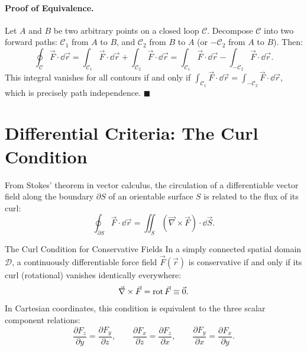 \paragraph{Proof of Equivalence.}
Let $A$ and $B$ be two arbitrary points on a closed loop $\mathcal{C}$. Decompose $\mathcal{C}$ into two forward paths: $\mathcal{C}_1$ from $A$ to $B$, and $\mathcal{C}_2$ from $B$ to $A$ (or $-\mathcal{C}_2$ from $A$ to $B$). Then:
\[
\oint_{\mathcal{C}} \vec{F}\cdot\dd\vec{r} = \int_{\mathcal{C}_1} \vec{F}\cdot\dd\vec{r} + \int_{\mathcal{C}_2} \vec{F}\cdot\dd\vec{r} = \int_{\mathcal{C}_1} \vec{F}\cdot\dd\vec{r} - \int_{-\mathcal{C}_2} \vec{F}\cdot\dd\vec{r}.
\]
This integral vanishes for all contours if and only if $\int_{\mathcal{C}_1} \vec{F}\cdot\dd\vec{r} = \int_{-\mathcal{C}_2} \vec{F}\cdot\dd\vec{r}$, which is precisely path independence. $\blacksquare$

\section{Differential Criteria: The Curl Condition}

From Stokes' theorem in vector calculus, the circulation of a differentiable vector field along the boundary $\partial S$ of an orientable surface $S$ is related to the flux of its curl:
\begin{equation}
\oint_{\partial S} \vec{F} \cdot \dd\vec{r} = \iint_S (\vec{\nabla} \times \vec{F}) \cdot \dd\vec{S}.
\end{equation}

\begin{lawbox}{The Curl Condition for Conservative Fields}
In a simply connected spatial domain $\mathcal{D}$, a continuously differentiable force field $\vec{F}(\vec{r})$ is conservative if and only if its curl (rotational) vanishes identically everywhere:
\begin{equation}
\vec{\nabla} \times \vec{F} = \operatorname{rot}\vec{F} \equiv \vec{0}.
\end{equation}
In Cartesian coordinates, this condition is equivalent to the three scalar component relations:
\begin{equation}
\frac{\partial F_z}{\partial y} = \frac{\partial F_y}{\partial z}, \qquad \frac{\partial F_x}{\partial z} = \frac{\partial F_z}{\partial x}, \qquad \frac{\partial F_y}{\partial x} = \frac{\partial F_x}{\partial y}.
\end{equation}
\end{lawbox}

